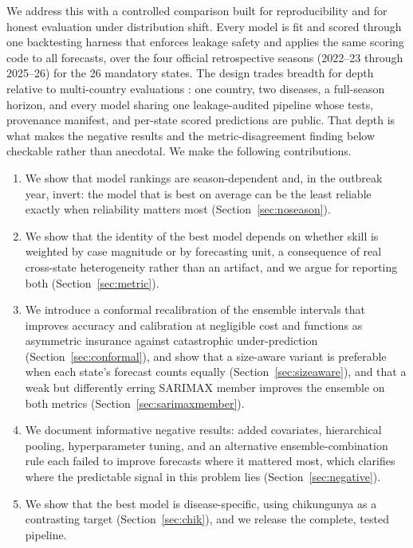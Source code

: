 \documentclass[11pt]{article}
\begin{document}
We address this with a controlled comparison built for reproducibility and for honest evaluation
under distribution shift. Every model is fit and scored through one backtesting harness that
enforces leakage safety and applies the same scoring code to all forecasts, over the four official
retrospective seasons (2022--23 through 2025--26) for the 26 mandatory states. The design trades
breadth for depth relative to multi-country evaluations \citep{wu2025}: one country, two diseases,
a full-season horizon, and every model sharing one leakage-audited pipeline whose tests, provenance
manifest, and per-state scored predictions are public. That depth is what makes the negative
results and the metric-disagreement finding below checkable rather than anecdotal. We make the
following contributions.

\begin{enumerate}
\item We show that model rankings are season-dependent and, in the outbreak year, invert: the model
that is best on average can be the least reliable exactly when reliability matters most
(Section~\ref{sec:noseason}).
\item We show that the identity of the best model depends on whether skill is weighted by case
magnitude or by forecasting unit, a consequence of real cross-state heterogeneity rather than an
artifact, and we argue for reporting both (Section~\ref{sec:metric}).
\item We introduce a conformal recalibration of the ensemble intervals that improves accuracy and
calibration at negligible cost and functions as asymmetric insurance against catastrophic
under-prediction (Section~\ref{sec:conformal}), and show that a size-aware variant is preferable
when each state's forecast counts equally (Section~\ref{sec:sizeaware}), and that a weak but
differently erring SARIMAX member improves the ensemble on both metrics
(Section~\ref{sec:sarimaxmember}).
\item We document informative negative results: added covariates, hierarchical pooling,
hyperparameter tuning, and an alternative ensemble-combination rule each failed to improve
forecasts where it mattered most, which clarifies where the predictable signal in this problem
lies (Section~\ref{sec:negative}).
\item We show that the best model is disease-specific, using chikungunya as a contrasting target
(Section~\ref{sec:chik}), and we release the complete, tested pipeline.
\end{enumerate}
\end{document}
